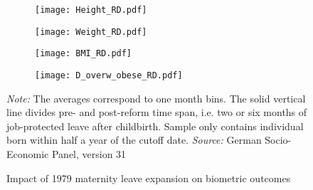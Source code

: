 \documentclass[a4paper ]{article}
\begin{document}
\clearpage
\newpage
\begin{figure}[p]
\begin{subfigure}[h]{0.48\textwidth}\centering
	\texttt{[image: Height\_RD.pdf]}
\end{subfigure}
\quad
\begin{subfigure}[h]{0.48\textwidth}\centering
	\texttt{[image: Weight\_RD.pdf]}
\end{subfigure}

\begin{subfigure}[h]{0.48\textwidth}\centering
	\texttt{[image: BMI\_RD.pdf]}
\end{subfigure}
\quad
\begin{subfigure}[h]{0.48\textwidth}\centering
	\texttt{[image: D\_overw\_obese\_RD.pdf]}
\end{subfigure}
\caption{Impact of 1979 maternity leave expansion on biometric outcomes}\label{fig: RD_BM}
\begin{minipage}{\textwidth} %
{\footnotesize \textit{Note:} The averages correspond to one month bins. The solid vertical line divides pre- and post-reform time span, i.e. two or six months of job-protected leave after childbirth. Sample only contains individual born within half a year of the cutoff date. \newline \textit{Source: }German Socio-Economic Panel, version 31\par}
\end{minipage}
\end{figure}
\newpage
\end{document}
